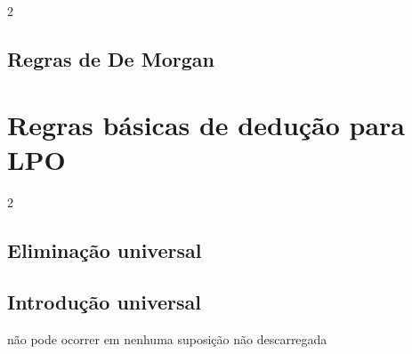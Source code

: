 \begin{multicols}{2}
\subsection*{Regras de De Morgan}
\begin{fitchproof}
\end{fitchproof}
\begin{fitchproof}
\end{fitchproof}
\begin{fitchproof}
\end{fitchproof}
\begin{fitchproof}
\end{fitchproof}
\end{multicols}


\section{Regras básicas de dedução para LPO}

\begin{multicols}{2}
\subsection*{Eliminação universal}

\begin{fitchproof}
	 
\end{fitchproof}

\subsection*{Introdução universal}

\begin{fitchproof}
	 
\end{fitchproof}
\begin{raggedright}
 não pode ocorrer em nenhuma suposição não descarregada
\end{raggedright}
\end{multicols}

